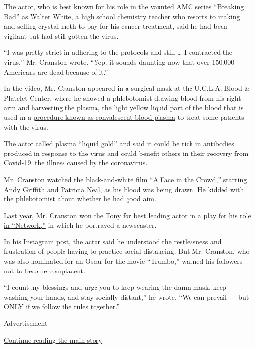 The actor, who is best known for his role in the
\href{https://www.nytimes3xbfgragh.onion/2011/07/10/magazine/the-dark-art-of-breaking-bad.html}{vaunted
AMC series ``Breaking Bad''} as Walter White, a high school chemistry
teacher who resorts to making and selling crystal meth to pay for his
cancer treatment, said he had been vigilant but had still gotten the
virus.

``I was pretty strict in adhering to the protocols and still \ldots{} I
contracted the virus,'' Mr. Cranston wrote. ``Yep. it sounds daunting
now that over 150,000 Americans are dead because of it.''

In the video, Mr. Cranston appeared in a surgical mask at the U.C.L.A.
Blood \& Platelet Center, where he showed a phlebotomist drawing blood
from his right arm and harvesting the plasma, the light yellow liquid
part of the blood that is used in a
\href{https://www.nytimes3xbfgragh.onion/2020/04/24/smarter-living/coronavirus-convalescent-plasma-antibodies.html}{procedure
known as convalescent blood plasma} to treat some patients with the
virus.

The actor called plasma ``liquid gold'' and said it could be rich in
antibodies produced in response to the virus and could benefit others in
their recovery from Covid-19, the illness caused by the coronavirus.

Mr. Cranston watched the black-and-white film ``A Face in the Crowd,''
starring Andy Griffith and Patricia Neal, as his blood was being drawn.
He kidded with the phlebotomist about whether he had good aim.

Last year, Mr. Cranston
\href{https://www.nytimes3xbfgragh.onion/2019/06/09/theater/bryan-cranston-tony-awards.html}{won
the Tony for best leading actor in a play for his role in ``Network,''}
in which he portrayed a newscaster.

In his Instagram post, the actor said he understood the restlessness and
frustration of people having to practice social distancing. But Mr.
Cranston, who was also nominated for an Oscar for the movie ``Trumbo,''
warned his followers not to become complacent.

``I count my blessings and urge you to keep wearing the damn mask, keep
washing your hands, and stay socially distant,'' he wrote. ``We can
prevail --- but ONLY if we follow the rules together.''

Advertisement

\protect\hyperlink{after-bottom}{Continue reading the main story}

